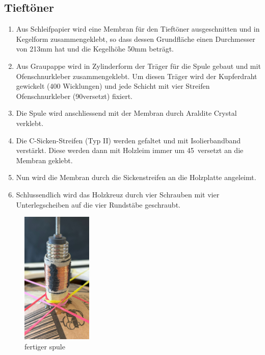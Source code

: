 \documentclass[a4paper,11pt]{report}
\begin{document}
\subsection{Tieftöner}
\begin{enumerate}
    \item Aus Schleifpapier wird eine Membran für den Tieftöner ausgeschnitten und in Kegelform zusammengeklebt, so dass dessen Grundfläche einen Durchmesser von 213mm hat und die Kegelhöhe 50mm beträgt.
    \item Aus Graupappe wird in Zylinderform der Träger für die Spule gebaut und mit Ofenschnurkleber zusammengeklebt. Um diesen Träger wird der Kupferdraht gewickelt (400 Wicklungen) und jede Schicht mit vier Streifen Ofenschnurkleber (90\textdegree versetzt) fixiert. 
    \item Die Spule wird anschliessend mit der Membran durch Araldite Crystal verklebt.
    \item Die C-Sicken-Streifen (Typ II) werden gefaltet und mit Isolierbandband verstärkt. Diese werden dann mit Holzleim immer um 45\textdegree\ versetzt an die Membran geklebt.
    \item Nun wird die Membran durch die Sickenstreifen an die Holzplatte angeleimt.
    \item Schlussendlich wird das Holzkreuz durch vier Schrauben mit vier Unterlegscheiben auf die vier Rundstäbe geschraubt.
\end{enumerate}
\begin{figure}[h]
    \centering
    \includegraphics[width=0.3\textwidth]{resources/images/Fotos/Physik-125.jpg}
    \caption{{fertiger spule}}
    \label{fig:spule_fin}
\end{figure}

\newpage
\end{document}
